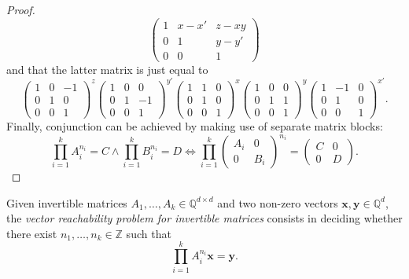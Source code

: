 \begin{proof}
\begin{equation*}
\begin{pmatrix}
        1 & x-x' & z-xy \\
        0 & 1 & y-y' \\
        0 & 0 & 1
    \end{pmatrix}
\end{equation*}
and that the latter matrix is just equal to
\begin{equation*}
    \begin{pmatrix}
        1 & 0 & -1 \\
        0 & 1 & 0 \\
        0 & 0 & 1
    \end{pmatrix}^{z}
    \begin{pmatrix}
        1 & 0 & 0 \\
        0 & 1 & -1 \\
        0 & 0 & 1
    \end{pmatrix}^{y'}
    \begin{pmatrix}
        1 & 1 & 0 \\
        0 & 1 & 0 \\
        0 & 0 & 1
    \end{pmatrix}^{x}
    \begin{pmatrix}
        1 & 0 & 0 \\
        0 & 1 & 1 \\
        0 & 0 & 1
    \end{pmatrix}^{y}
    \begin{pmatrix}
        1 & -1 & 0 \\
        0 & 1 & 0 \\
        0 & 0 & 1
    \end{pmatrix}^{x'}.
\end{equation*}
Finally, conjunction can be achieved by making use of separate matrix blocks:
\begin{equation*}
    \prod\limits_{i=1}^{k} A_{i}^{n_{i}} = C \wedge \prod\limits_{i=1}^{k} B_{i}^{n_{i}} = D \Leftrightarrow
    \prod\limits_{i=1}^{k} \begin{pmatrix}A_{i} & 0 \\ 0 & B_{i}\end{pmatrix}^{n_{i}} = \begin{pmatrix}C & 0 \\ 0 & D\end{pmatrix}.
\end{equation*}
\end{proof}

\begin{definition}
Given invertible matrices $A_{1}, \ldots, A_{k} \in \mathbb{Q}^{d \times d}$ and two non-zero vectors $\boldsymbol{x}, \boldsymbol{y} \in \mathbb{Q}^{d}$, the \emph{vector reachability problem for invertible matrices} consists in deciding whether there exist $n_{1}, \ldots, n_{k} \in \mathbb{Z}$ such that
\begin{equation*}
\prod\limits_{i=1}^{k}A_{i}^{n_{i}} \boldsymbol{x} = \boldsymbol{y}.
\end{equation*}
\end{definition}

